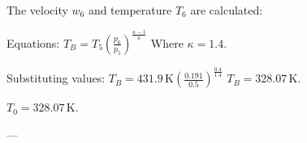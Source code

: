 The velocity \( w_6 \) and temperature \( T_6 \) are calculated:  

Equations:  
\( T_B = T_5 \left( \frac{p_6}{p_5} \right)^{\frac{\kappa - 1}{\kappa}} \)  
Where \( \kappa = 1.4 \).  

Substituting values:  
\( T_B = 431.9 \, \text{K} \left( \frac{0.191}{0.5} \right)^{\frac{0.4}{1.4}} \)  
\( T_B = 328.07 \, \text{K} \).  

\( T_0 = 328.07 \, \text{K} \).  

---
